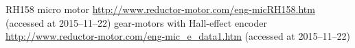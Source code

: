 \documentclass[11pt]{article}
\begin{document}
\begin{thebibliography}{99}
 RH158 micro motor \url{http://www.reductor-motor.com/eng-micRH158.htm} (accessed at 2015--11--22)
 gear-motors with Hall-effect encoder \url{http://www.reductor-motor.com/eng-mic_e_data1.htm} (accessed at 2015--11--22)
\end{thebibliography}
\end{document}
